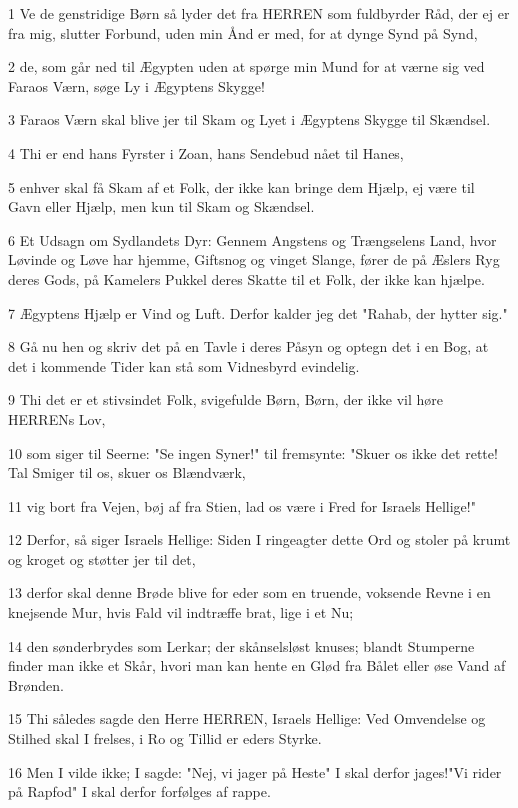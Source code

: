 \par 1 Ve de genstridige Børn så lyder det fra HERREN som fuldbyrder Råd, der ej er fra mig, slutter Forbund, uden min Ånd er med, for at dynge Synd på Synd,
\par 2 de, som går ned til Ægypten uden at spørge min Mund for at værne sig ved Faraos Værn, søge Ly i Ægyptens Skygge!
\par 3 Faraos Værn skal blive jer til Skam og Lyet i Ægyptens Skygge til Skændsel.
\par 4 Thi er end hans Fyrster i Zoan, hans Sendebud nået til Hanes,
\par 5 enhver skal få Skam af et Folk, der ikke kan bringe dem Hjælp, ej være til Gavn eller Hjælp, men kun til Skam og Skændsel.
\par 6 Et Udsagn om Sydlandets Dyr: Gennem Angstens og Trængselens Land, hvor Løvinde og Løve har hjemme, Giftsnog og vinget Slange, fører de på Æslers Ryg deres Gods, på Kamelers Pukkel deres Skatte til et Folk, der ikke kan hjælpe.
\par 7 Ægyptens Hjælp er Vind og Luft. Derfor kalder jeg det "Rahab, der hytter sig."
\par 8 Gå nu hen og skriv det på en Tavle i deres Påsyn og optegn det i en Bog, at det i kommende Tider kan stå som Vidnesbyrd evindelig.
\par 9 Thi det er et stivsindet Folk, svigefulde Børn, Børn, der ikke vil høre HERRENs Lov,
\par 10 som siger til Seerne: "Se ingen Syner!" til fremsynte: "Skuer os ikke det rette! Tal Smiger til os, skuer os Blændværk,
\par 11 vig bort fra Vejen, bøj af fra Stien, lad os være i Fred for Israels Hellige!"
\par 12 Derfor, så siger Israels Hellige: Siden I ringeagter dette Ord og stoler på krumt og kroget og støtter jer til det,
\par 13 derfor skal denne Brøde blive for eder som en truende, voksende Revne i en knejsende Mur, hvis Fald vil indtræffe brat, lige i et Nu;
\par 14 den sønderbrydes som Lerkar; der skånselsløst knuses; blandt Stumperne finder man ikke et Skår, hvori man kan hente en Glød fra Bålet eller øse Vand af Brønden.
\par 15 Thi således sagde den Herre HERREN, Israels Hellige: Ved Omvendelse og Stilhed skal I frelses, i Ro og Tillid er eders Styrke.
\par 16 Men I vilde ikke; I sagde: "Nej, vi jager på Heste" I skal derfor jages!"Vi rider på Rapfod" I skal derfor forfølges af rappe.
